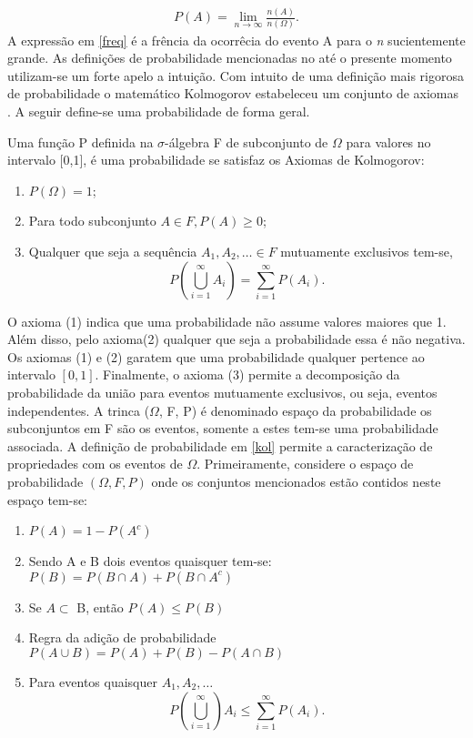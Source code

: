 	\begin{align*}
		P(A) = \displaystyle\lim_{n \to \infty} \frac{n (A)} {n(\Omega)}.  
	\end{align*} A
	express\~ao em \autoref{freq} \'e a fr\^{e}ncia da ocorr\^{e}cia do evento A para o \textit{n}
	sucientemente grande.  As defini\c{c}\~{o}es de probabilidade mencionadas no at\'e o presente momento
	utilizam-se um forte apelo a intui\c c\~ao. Com intuito de uma defini\c c\~ao mais rigorosa de
	probabilidade o matem\'{a}tico Kolmogorov estabeleceu um conjunto de axiomas \cite{magalhaes}. A seguir
	define-se uma probabilidade de forma geral.  
	\begin{defin}[Probabilidade] \label{kol} Uma fun\c{c}\~{a}o P
definida na $\sigma$-\'{a}lgebra F de subconjunto de $\Omega$ para valores no intervalo [0,1], \'{e} uma
probabilidade se satisfaz os Axiomas de Kolmogorov: \\ 
		\begin{enumerate} 
			\item $P(\Omega)= 1$; 
			\item Para todo	subconjunto $ A \in F, P(A) \geq 0$; 
			\item Qualquer que seja a sequ\^{e}ncia 
			$A_1, A_2, \dots \in F$
			mutuamente exclusivos tem-se, $$P( \bigcup\limits_{i = 1}^{\infty}A_i) = \sum\limits_{i =
			1}^{\infty} P(A_i).$$ 
		\end{enumerate}
	\end{defin}
O axioma (1) indica que uma probabilidade n\~ao
assume valores maiores que 1. Al\'em disso, pelo axioma(2) qualquer que seja a probabilidade essa
\'e n\~ao negativa. Os axiomas (1) e (2) garatem que uma probabilidade qualquer pertence ao
intervalo $[0,1]$. Finalmente, o axioma (3) permite  a decomposi\c c\~ao da probabilidade da
uni\~ao para eventos mutuamente exclusivos, ou seja, eventos independentes.  A trinca ($\Omega$,
F, P) \'e denominado espa\c{c}o da probabilidade os subconjuntos em F s\~{a}o os eventos, somente
a estes tem-se uma probabilidade associada. A defini\c c\~ao de probabilidade em \ref{kol} permite
a caracteriza\c c\~ao de propriedades com os eventos de $\Omega$. Primeiramente, considere o
espa\c{c}o de probabilidade $(\Omega, F, P )$ onde os conjuntos mencionados est\~{a}o contidos
neste espa\c{c}o tem-se: 
\begin{enumerate} 
	\item $P(A) = 1 - P(A^c)$
	\item Sendo A e B dois eventos
	quaisquer tem-se: \\ $P(B)= P(B \cap A) + P(B \cap A^c) $ \item Se $ A \subset $ B, ent\~{a}o
	$P(A) \leq P(B)$
	\item Regra da adi\c{c}\~{a}o de probabilidade  \\ $ P(A \cup B)= P(A) +
	P(B) - P(A \cap B)$ \item Para eventos quaisquer $A_1, A_2, \dots $ \\
	$$P(\bigcup\limits_{i = 1}^{\infty})A_i \leq \sum\limits_{i = 1}^{\infty} P(A_i).$$
	\end{enumerate}
